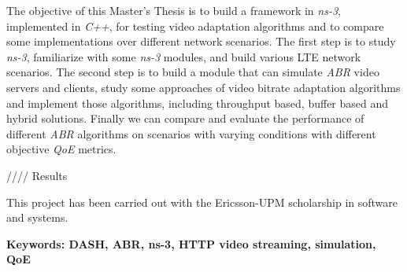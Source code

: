 The objective of this Master's Thesis is to build a framework in \textit{ns-3}, implemented
in \textit{C++}, for testing video adaptation algorithms and to compare some implementations
over different network scenarios. The first step is to study \textit{ns-3}, familiarize with
some \textit{ns-3} modules, and build various LTE network scenarios. The second step is to
build a module that can simulate \textit{ABR} video servers and clients, study some approaches
of video bitrate adaptation algorithms and implement those algorithms, including
throughput based, buffer based and hybrid solutions. Finally we can compare and 
evaluate the performance of different \textit{ABR} algorithms on scenarios with varying 
conditions with different objective \textit{QoE} metrics.

//// Results

This project has been carried out with the Ericsson-UPM scholarship in software and systems.

\vfill
\textbf{Keywords: DASH, ABR, ns-3, HTTP video streaming, simulation, QoE} 